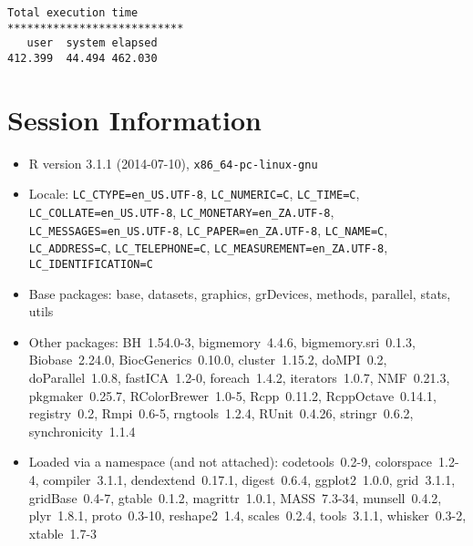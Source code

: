 \documentclass[10pt]{article}\usepackage[]{graphicx}\usepackage[]{color}
\begin{document}
\begin{verbatim}
Total execution time
***************************
   user  system elapsed 
412.399  44.494 462.030 

\end{verbatim}

\section*{Session Information}
\begin{itemize}\raggedright
  \item R version 3.1.1 (2014-07-10), \verb|x86_64-pc-linux-gnu|
  \item Locale: \verb|LC_CTYPE=en_US.UTF-8|, \verb|LC_NUMERIC=C|, \verb|LC_TIME=C|, \verb|LC_COLLATE=en_US.UTF-8|, \verb|LC_MONETARY=en_ZA.UTF-8|, \verb|LC_MESSAGES=en_US.UTF-8|, \verb|LC_PAPER=en_ZA.UTF-8|, \verb|LC_NAME=C|, \verb|LC_ADDRESS=C|, \verb|LC_TELEPHONE=C|, \verb|LC_MEASUREMENT=en_ZA.UTF-8|, \verb|LC_IDENTIFICATION=C|
  \item Base packages: base, datasets, graphics, grDevices, methods,
    parallel, stats, utils
  \item Other packages: BH~1.54.0-3, bigmemory~4.4.6,
    bigmemory.sri~0.1.3, Biobase~2.24.0, BiocGenerics~0.10.0,
    cluster~1.15.2, doMPI~0.2, doParallel~1.0.8, fastICA~1.2-0,
    foreach~1.4.2, iterators~1.0.7, NMF~0.21.3, pkgmaker~0.25.7,
    RColorBrewer~1.0-5, Rcpp~0.11.2, RcppOctave~0.14.1, registry~0.2,
    Rmpi~0.6-5, rngtools~1.2.4, RUnit~0.4.26, stringr~0.6.2,
    synchronicity~1.1.4
  \item Loaded via a namespace (and not attached): codetools~0.2-9,
    colorspace~1.2-4, compiler~3.1.1, dendextend~0.17.1, digest~0.6.4,
    ggplot2~1.0.0, grid~3.1.1, gridBase~0.4-7, gtable~0.1.2,
    magrittr~1.0.1, MASS~7.3-34, munsell~0.4.2, plyr~1.8.1,
    proto~0.3-10, reshape2~1.4, scales~0.2.4, tools~3.1.1,
    whisker~0.3-2, xtable~1.7-3
\end{itemize}
\end{document}
